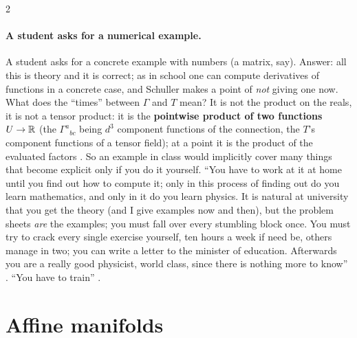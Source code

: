 \begin{paracol}{2}
\paragraph{A student asks for a numerical example.} A student asks for a concrete example with numbers (a matrix, say). Answer: all this is
theory and it is correct; as in school one can compute derivatives of functions in a concrete case, and Schuller makes a point
of \emph{not} giving one now. What does the ``times'' between $\Gamma$ and $T$ mean? It is not the product on the reals, it is not a
tensor product: it is the \textbf{pointwise product of two functions} $U\to\mathbb{R}$ (the $\Gamma^{a}{}_{bc}$ being $d^3$ component functions
of the connection, the $T$'s component functions of a tensor field); at a point it is the product of the evaluated factors
. So an example in class would implicitly cover many things that become explicit only if you do it yourself.
``You have to work at it at home until you find out how to compute it; only in this process of finding out do you learn mathematics,
and only in it do you learn physics. It is natural at university that you get the theory (and I give examples now and then),
but the problem sheets \emph{are} the examples; you must fall over every stumbling block once. You must try to crack every
single exercise yourself, ten hours a week if need be, others manage in two; you can write a letter to the minister of
education. Afterwards you are a really good physicist, world class, since there is nothing more to know'' .
``You have to train'' .

\section{Affine manifolds}\label{sec:cf-affine}


\end{paracol}
